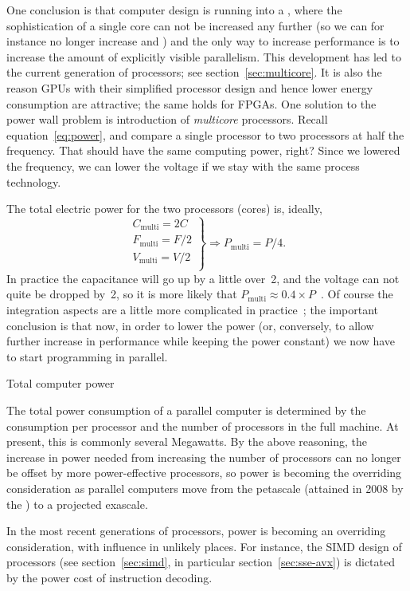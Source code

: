 One conclusion is that computer design
is running into a , where the sophistication
of a single core can not be increased any further (so we can for
instance no longer increase  and
) and the only way to increase
performance is to increase the amount of explicitly visible
parallelism. This development has led to the current generation of
 processors; see section~\ref{sec:multicore}. It
is also the reason \acp{GPU} with their simplified processor design
and hence lower energy consumption
are attractive; the same holds for \acp{FPGA}.
One solution to the power wall problem is introduction
of \emph{multicore} processors.
Recall equation~\ref{eq:power}, and compare a single processor to two 
processors at half the frequency. That should have the same computing power, right?
Since we lowered the frequency, we can lower the voltage if we stay with the same 
process technology.

The total electric power for the two processors (cores) is, ideally,
\[ \left.
\begin{array}{c}
C_{\mathrm{multi}} = 2C\\
F_{\mathrm{multi}} = F/2\\
V_{\mathrm{multi}} = V/2\\
\end{array}\right\} \Rightarrow
P_{\mathrm{multi}} = P/4.
\]
In practice the capacitance will go up by a little over~2, and the
voltage can not quite be dropped by~2, so it is more likely that
$P_{\mathrm{multi}} \approx 0.4\times
P$~\cite{Chandrakasa:transformations}.  Of course the integration
aspects are a little more complicated in
practice~\cite{Bohr:ISSCC2009}; the important conclusion is that now,
in order to lower the power (or, conversely, to allow further increase
in performance while keeping the power constant) we now have to start
programming in parallel.

 {Total computer power}

The total power consumption of a parallel computer is determined by
the consumption per processor and the number of processors in the full
machine. At present, this is commonly several Megawatts. By the above
reasoning, the increase in power needed from increasing the number of
processors can no longer be offset by more power-effective processors,
so power is becoming the overriding consideration as parallel
computers move from the petascale (attained in 2008 by the
) to a projected exascale.

In the most recent generations of processors, power is becoming an
overriding consideration, with influence in unlikely places. For
instance, the \ac{SIMD} design of processors (see
section~\ref{sec:simd}, in particular section~\ref{sec:sse-avx}) is
dictated by the power cost of instruction decoding.
